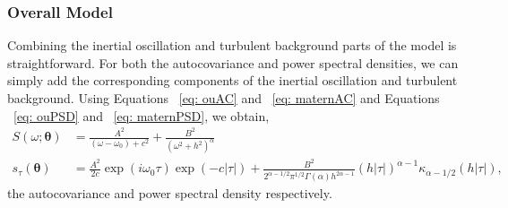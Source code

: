 \documentclass{stat572Style}
\begin{document}
\subsubsection{Overall Model}
Combining the inertial oscillation and turbulent background parts of the model is straightforward. For both the autocovariance and power spectral densities, we can simply add the corresponding components of the inertial oscillation and turbulent background. Using Equations ~\ref{eq: ouAC} and ~\ref{eq: maternAC} and Equations ~\ref{eq: ouPSD} and ~\ref{eq: maternPSD}, we obtain,
\begin{align}
S(\omega; \boldsymbol{\theta}) &= \frac{A^{2}}{(\omega - \omega_{0}) + c^{2}} + \frac{B^{2}}{(\omega^{2} + h^{2})^{\alpha}}\\
s_{\tau}(\boldsymbol{\theta}) &= \frac{A^{2}}{2c} \exp(i \omega_{0}\tau) \exp(-c|\tau|) +  \frac{B^{2}}{2^{\alpha - 1/2}\pi^{1/2} \Gamma(\alpha) h^{2 \alpha - 1}}(h|\tau|)^{\alpha - 1}\kappa_{\alpha - 1/2}(h|\tau|),
\end{align}
 the autocovariance and power spectral density respectively. 


\end{document}
